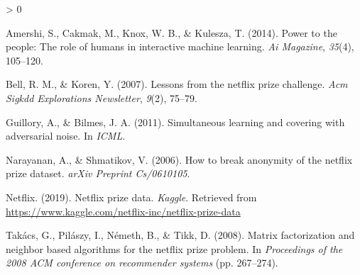 \documentclass[
  english,
  man,floatsintext]{apa6}
\newlength{\cslhangindent}
\newenvironment{CSLReferences}[2] %
 {%
  \setlength{\parindent}{0pt}
  \ifodd #1 \everypar{\setlength{\hangindent}{\cslhangindent}}\ignorespaces\fi
  \ifnum #2 > 0
  \setlength{\parskip}{#2\baselineskip}
  \fi
 }%
 {}
\begin{document}
\begingroup
\setlength{\parindent}{-0.5in}
\setlength{\leftskip}{0.5in}

\hypertarget{refs}{}
\begin{CSLReferences}{1}{0}
\leavevmode\hypertarget{ref-amershi2014power}{}%
Amershi, S., Cakmak, M., Knox, W. B., \& Kulesza, T. (2014). Power to the people: The role of humans in interactive machine learning. \emph{Ai Magazine}, \emph{35}(4), 105--120.

\leavevmode\hypertarget{ref-bell2007lessons}{}%
Bell, R. M., \& Koren, Y. (2007). Lessons from the netflix prize challenge. \emph{Acm Sigkdd Explorations Newsletter}, \emph{9}(2), 75--79.

\leavevmode\hypertarget{ref-guillory2011simultaneous}{}%
Guillory, A., \& Bilmes, J. A. (2011). Simultaneous learning and covering with adversarial noise. In \emph{ICML}.

\leavevmode\hypertarget{ref-narayanan2006break}{}%
Narayanan, A., \& Shmatikov, V. (2006). How to break anonymity of the netflix prize dataset. \emph{arXiv Preprint Cs/0610105}.

\leavevmode\hypertarget{ref-netflix_2019}{}%
Netflix. (2019). Netflix prize data. \emph{Kaggle}. Retrieved from \url{https://www.kaggle.com/netflix-inc/netflix-prize-data}

\leavevmode\hypertarget{ref-takacs2008matrix}{}%
Takács, G., Pilászy, I., Németh, B., \& Tikk, D. (2008). Matrix factorization and neighbor based algorithms for the netflix prize problem. In \emph{Proceedings of the 2008 ACM conference on recommender systems} (pp. 267--274).

\end{CSLReferences}

\endgroup
\end{document}
